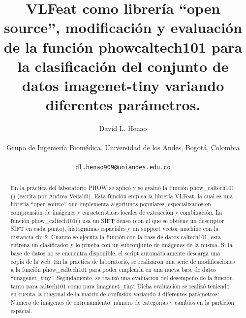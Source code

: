 \documentclass[10pt,twocolumn,letterpaper]{article}
\begin{document}
\title{VLFeat como librería “open source”, modificación y evaluación de la función phowcaltech101 para la clasificación del conjunto de datos imagenet-tiny variando diferentes parámetros.}

\author{David L. Henao\\
\begin{normalsize}
Grupo de Ingeniería Biomédica. Universidad de los Andes, Bogotá, Colombia
\end{normalsize}
\\
{\tt\small dl.henao909@uniandes.edu.co}}
\maketitle

\begin{abstract}

En la práctica del laboratorio PHOW se aplicó y se evaluó la función phow\_caltech101 () (escrita por Andrea Vedaldi). Esta función emplea la librería VLFeat, la cual es una librería “open source” que implementa algorítmos populares, especializados en comprensión de imágenes y características locales de extracción y combinación.
La función phow\_caltech101() usa un SIFT denso (con el que se obtiene un descriptor SIFT en cada punto), histogramas espaciales y un support vector machine con la distancia chi 2. Cuando se ejecuta la función con la base de datos caltech101, esta entrena un clasificador y lo prueba con un subconjunto de imágenes de la misma. Si la base de datos no se encuentra disponible, el script automáticamente descarga una copia de la web.
En la práctica de laboratorio, se realizaron una serie de modificaciones a la función phow\_caltech101 para poder emplearla en una nueva base de datos “imagenet\_tiny”. Seguidamente, se realizó una evaluación del desempeño de la función tanto para caltech101 como para imagenet\_tiny. Dicha evaluación se realizó teniendo en cuenta la diagonal de la matriz de confusión variando 3 diferentes parámetros: Número de imágenes de entrenamiento, número de categorías y cambios en la partición espacial.
   
\end{abstract}
\end{document}
